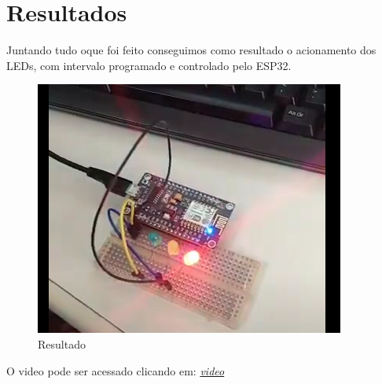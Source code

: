 \documentclass[12pt]{article}
\begin{document}
\section{Resultados}
Juntando tudo oque foi feito conseguimos como resultado o acionamento dos LEDs, com intervalo programado e controlado pelo ESP32.
\begin{figure}[ht]
  \centering
  \includegraphics[width=.35\textwidth]{Images/Captura de tela 2022-09-26 140817.png}
  \caption{Resultado}
  \label{fig:exampleLedPiscando}
\end{figure}

O video pode ser acessado clicando em: \emph{\href{https://imgur.com/a/BEnh8kg}{video}}



\nocite{SANDROJUCA}
\end{document}
